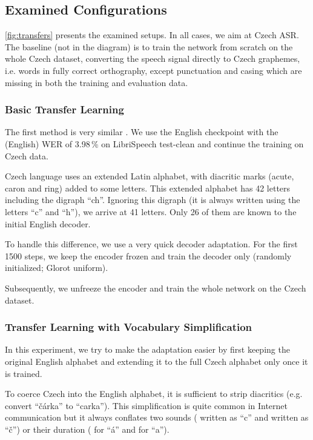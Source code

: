 \subsection{Examined Configurations}

\cref{fig:transfers} presents the examined setups. In all cases, we aim at Czech ASR. The baseline (not in the diagram) is to train the network from scratch on the whole Czech dataset, converting the speech signal directly to Czech graphemes, i.e. words in fully correct orthography, except punctuation and casing which are missing in both the training and evaluation data.

\subsubsection{Basic Transfer Learning}
\label{basic_transfer}

The first method is very similar . We use the English checkpoint with the (English) WER of 3.98\,\% on LibriSpeech test-clean and continue the training on Czech data.

Czech language uses an extended Latin alphabet, with diacritic marks (acute, caron and ring) added to some letters. This extended alphabet has 42 letters including the digraph ``ch''. Ignoring this digraph (it is always written using the letters ``c'' and ``h''), we arrive at 41 letters. Only 26 of them are known to the initial English decoder.

To handle this difference, we use a very quick decoder adaptation. For the first 1500 steps, we keep the encoder frozen and train the decoder only (randomly initialized; Glorot uniform).


Subsequently, we unfreeze the encoder and train the whole network on the Czech dataset.

\subsubsection{Transfer Learning with Vocabulary Simplification}

In this experiment, we try to make the adaptation easier by first keeping the original English alphabet and extending it to the full Czech alphabet only once it is trained.

To coerce Czech into the English alphabet, it is sufficient to strip diacritics (e.g. convert ``\v{c}\'arka'' to ``carka''). This simplification is quite common in Internet communication but it always conflates two sounds (\textipa{[ts]} written as ``c'' and \textipa{[tS]} written as ``\v{c}'')  or their duration (\textipa{[a:]} for ``\'a'' and \textipa{[a]} for ``a'').

